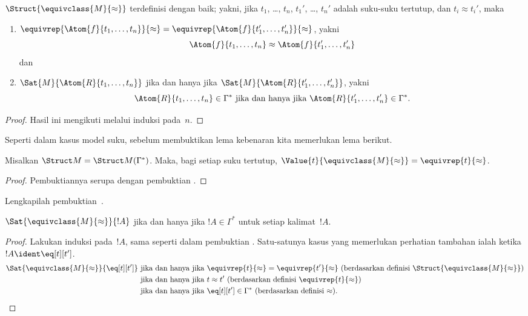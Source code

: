 \documentclass[../../../include/open-logic-section]{subfiles}
\begin{document}
\begin{prop}
$\Struct{\equivclass{M}{\approx}}$ terdefinisi dengan baik; yakni, jika
$t_1$, \dots, $t_n$, $t_1'$, \dots, $t_n'$ adalah suku-suku tertutup,
dan $t_i \approx t_i'$, maka
\begin{enumerate}
\item $\equivrep{\Atom{f}{t_1,\dots, t_n}}{\approx} =
    \equivrep{\Atom{f}{t_1',\dots, t_n'}}{\approx}$, yakni
  \[
  \Atom{f}{t_1,\dots, t_n} \approx \Atom{f}{t_1',\dots, t_n'}
  \]
  dan
\item $\Sat{M}{\Atom{R}{t_1,\dots, t_n}}$ jika dan hanya jika
  $\Sat{M}{\Atom{R}{t_1',\dots, t_n'}}$, yakni
  \[
    \Atom{R}{t_1,\dots, t_n} \in \Gamma^* \text{ jika dan hanya jika }
    \Atom{R}{t_1',\dots, t_n'} \in \Gamma^*.
  \]
\end{enumerate}
\end{prop}

\begin{proof}
Hasil ini mengikuti  melalui induksi pada~$n$.
\end{proof}

Seperti dalam kasus model suku, sebelum membuktikan lema kebenaran kita
memerlukan lema berikut.

\begin{lem}
 Misalkan $\Struct M = \Struct M
 (\Gamma^*)$. Maka, bagi setiap suku tertutup,
$\Value{t}{\equivclass{M}{\approx}} = \equivrep{t} {\approx}$.
\end{lem}
\begin{proof}
Pembuktiannya serupa dengan pembuktian
.
\end{proof}

\begin{prob}
Lengkapilah pembuktian~.
\end{prob}

\begin{lem}
$\Sat{\equivclass{M}{\approx}}{!A}$ jika dan hanya jika $!A \in
\Gamma^*$ untuk setiap kalimat~$!A$.
\end{lem}

\begin{proof}
Lakukan induksi pada~$!A$, sama seperti dalam pembuktian
. Satu-satunya kasus yang memerlukan perhatian
tambahan ialah ketika $!A \ident \eq[t][t']$.
\begin{align*}
\Sat{\equivclass{M}{\approx}}{\eq[t][t']} & \text{ jika dan hanya jika } \equivrep{t}{\approx} = \equivrep{t'}{\approx}
\text{ (berdasarkan definisi $\Struct{\equivclass{M}{\approx}}$)}\\
& \text{ jika dan hanya jika } t \approx t' \text{ (berdasarkan definisi $\equivrep{t}{\approx}$)}\\
& \text{ jika dan hanya jika } \eq[t][t'] \in \Gamma^* \text{ (berdasarkan definisi $\approx$).}
\end{align*}
\end{proof}
\end{document}

